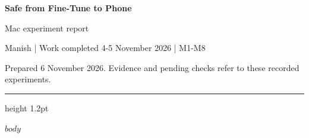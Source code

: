 \documentclass[11pt,a4paper]{article}
\begin{document}
{\sffamily\bfseries\fontsize{23}{27}\selectfont\color{Ink}Safe from Fine-Tune to Phone\par}
\vspace{3pt}
{\sffamily\fontsize{15}{19}\selectfont\color{Accent}Mac experiment report\par}
\vspace{4pt}
{\small\sffamily\color{Muted}Manish | Work completed 4-5 November 2026 | M1-M8\par}
{\footnotesize\sffamily\color{Muted}Prepared 6 November 2026. Evidence and pending checks refer to these recorded experiments.\par}
\vspace{5pt}
{\color{Accent}\hrule height 1.2pt}
\vspace{5pt}
$body$
\end{document}

